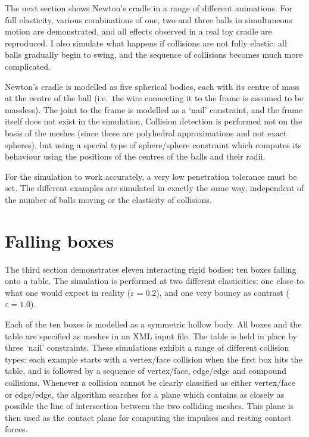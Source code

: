The next section shows Newton's cradle in a range of different animations. For full elasticity,
various combinations of one, two and three balls in simultaneous motion are demonstrated, and all
effects observed in a real toy cradle are reproduced. I also simulate what happens if collisions
are not fully elastic: all balls gradually begin to swing, and the sequence of collisions becomes
much more complicated.

Newton's cradle is modelled as five spherical bodies, each with its centre of mass at the centre
of the ball (i.e.\ the wire connecting it to the frame is assumed to be massless). The joint to
the frame is modelled as a `nail' constraint, and the frame itself does not exist in the
simulation. Collision detection is performed not on the basis of the meshes (since these are
polyhedral approximations and not exact spheres), but using a special type of sphere/sphere
constraint which computes its behaviour using the positions of the centres of the balls and their
radii.

For the simulation to work accurately, a very low penetration tolerance must be set. The different
examples are simulated in exactly the same way, independent of the number of balls moving or the
elasticity of collisions.

\section{Falling boxes}

The third section demonstrates eleven interacting rigid bodies: ten boxes falling onto a table.
The simulation is performed at two different elasticities: one close to what one would expect in
reality ($\varepsilon = 0.2$), and one very bouncy as contrast ($\varepsilon = 1.0$).

Each of the ten boxes is modelled as a symmetric hollow body. All boxes and the table are
specified as meshes in an XML input file. The table is held in place by three `nail' constraints.
These simulations exhibit a range of different collision types: each example starts with a
vertex/face collision when the first box hits the table, and is followed by a sequence of
vertex/face, edge/edge and compound collisions. Whenever a collision cannot be clearly classified
as either vertex/face or edge/edge, the algorithm searches for a plane which contains as closely
as possible the line of intersection between the two colliding meshes. This plane is then used as
the contact plane for computing the impulses and resting contact forces.

